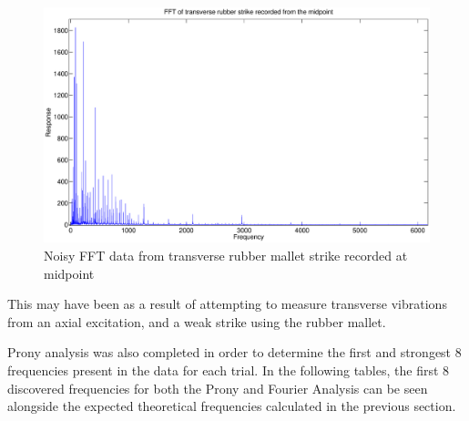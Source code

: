 \begin{figure}[H]
	\centering
	\includegraphics[width=\textwidth]{../figures/badFFT.eps}
	\caption{Noisy FFT data from transverse rubber mallet strike recorded at midpoint}
	\label{fig:badFFT}
\end{figure}

This may have been as a result of attempting to measure transverse vibrations from an axial excitation, and a weak strike using the rubber mallet. 

Prony analysis was also completed in order to determine the first and strongest 8 frequencies present in the data for each trial. In the following tables, the first 8 discovered frequencies for both the Prony and Fourier Analysis can be seen alongside the expected theoretical frequencies calculated in the previous section. 

\begin{table}[h]
\centering
{}
\caption{FFT extracted frequencies for each trial compared to theoretically expected frequencies}
\end{table}

